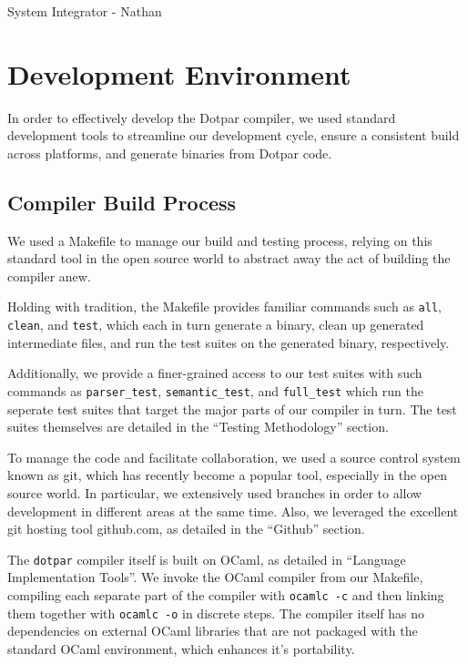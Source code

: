 System Integrator - Nathan

\section{Development Environment}

In order to effectively develop the Dotpar compiler, we used standard
development tools to streamline our development cycle, ensure a
consistent build across platforms, and generate binaries from Dotpar
code.

\subsection{Compiler Build Process}

We used a Makefile to manage our build and testing process, relying on
this standard tool in the open source world to abstract away the act
of building the compiler anew.

Holding with tradition, the Makefile provides familiar commands such
as \texttt{all}, \texttt{clean}, and \texttt{test}, which each in turn
generate a binary, clean up generated intermediate files, and run the
test suites on the generated binary, respectively. 

Additionally, we provide a finer-grained access to our test suites
with such commands as \texttt{parser\_test}, \texttt{semantic\_test},
and \texttt{full\_test} which run the seperate test suites that target
the major parts of our compiler in turn. The test suites themselves
are detailed in the ``Testing Methodology'' section.

To manage the code and facilitate collaboration, we used a source
control system known as git, which has recently become a popular tool,
especially in the open source world. In particular, we extensively
used branches in order to allow development in different areas at the
same time. Also, we leveraged the excellent git hosting tool
github.com, as detailed in the ``Github'' section.

The \texttt{dotpar} compiler itself is built on OCaml, as detailed in
``Language Implementation Tools''. We invoke the OCaml compiler from
our Makefile, compiling each separate part of the compiler with
\texttt{ocamlc -c} and then linking them together with \texttt{ocamlc
  -o} in discrete steps. The compiler itself has no dependencies on
external OCaml libraries that are not packaged with the standard OCaml
environment, which enhances it's portability.

